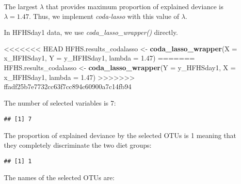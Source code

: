\documentclass[openany]{book}
\newenvironment{Shaded}{\begin{snugshade}}{\end{snugshade}}
\newcommand{\KeywordTok}[1]{\textcolor[rgb]{0.13,0.29,0.53}{\textbf{#1}}}
\newcommand{\DataTypeTok}[1]{\textcolor[rgb]{0.13,0.29,0.53}{#1}}
\newcommand{\FloatTok}[1]{\textcolor[rgb]{0.00,0.00,0.81}{#1}}
\newcommand{\StringTok}[1]{\textcolor[rgb]{0.31,0.60,0.02}{#1}}
\newcommand{\OperatorTok}[1]{\textcolor[rgb]{0.81,0.36,0.00}{\textbf{#1}}}
\newcommand{\NormalTok}[1]{#1}
\begin{document}
The largest \(\lambda\) that provides maximum proportion of explained
deviance is \(\lambda = 1.47\). Thus, we implement \emph{coda-lasso}
with this value of \(\lambda\).

In HFHSday1 data, we use \emph{coda\_lasso\_wrapper()} directly.

\begin{Shaded}
\begin{Highlighting}[]
<<<<<<< HEAD
\NormalTok{HFHS.results_codalasso <-}\StringTok{ }\KeywordTok{coda_lasso_wrapper}\NormalTok{(}\DataTypeTok{X =}\NormalTok{ x_HFHSday1, }\DataTypeTok{Y =}\NormalTok{ y_HFHSday1, }\DataTypeTok{lambda =} \FloatTok{1.47}\NormalTok{) }
=======
\NormalTok{HFHS.results_codalasso <-}\StringTok{ }\KeywordTok{coda_lasso_wrapper}\NormalTok{(}\DataTypeTok{Y =}\NormalTok{ y_HFHSday1, }\DataTypeTok{X =}\NormalTok{ x_HFHSday1, }\DataTypeTok{lambda =} \FloatTok{1.47}\NormalTok{) }
>>>>>>> ffadf25b7e7732cc63f7cc894c60900a7c14fb94
\end{Highlighting}
\end{Shaded}

The number of selected variables is 7:

\begin{Shaded}
\end{Shaded}

\begin{verbatim}
## [1] 7
\end{verbatim}

The proportion of explained deviance by the selected OTUs is 1 meaning
that they completely discriminate the two diet groups:

\begin{Shaded}
\end{Shaded}

\begin{verbatim}
## [1] 1
\end{verbatim}

The names of the selected OTUs are:

\begin{Shaded}
\end{Shaded}
\end{document}
